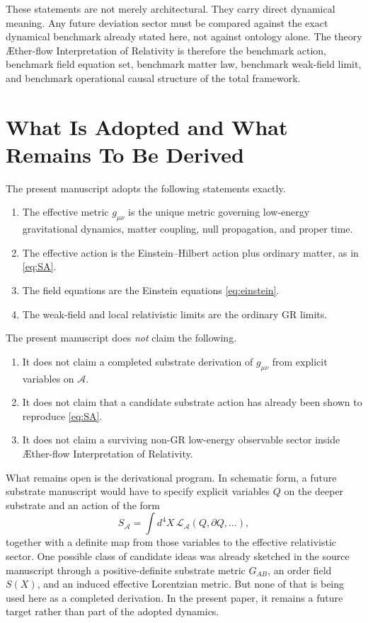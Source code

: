 \documentclass[11pt]{article}
\newcommand{\Aflow}{\AE{}ther-flow}
\newcommand{\TheoryName}{\Aflow{} Interpretation of Relativity}
\newcommand{\Sub}{\mathcal{A}}
\begin{document}
These statements are not merely architectural. They carry direct dynamical meaning. Any future deviation sector must be compared against the exact dynamical benchmark already stated here, not against ontology alone. The theory \TheoryName{} is therefore the benchmark action, benchmark field equation set, benchmark matter law, benchmark weak-field limit, and benchmark operational causal structure of the total framework.

\section{What Is Adopted and What Remains To Be Derived}

The present manuscript adopts the following statements exactly.
\begin{enumerate}
    \item The effective metric \(g_{\mu\nu}\) is the unique metric governing low-energy gravitational dynamics, matter coupling, null propagation, and proper time.
    \item The effective action is the Einstein--Hilbert action plus ordinary matter, as in \eqref{eq:SA}.
    \item The field equations are the Einstein equations \eqref{eq:einstein}.
    \item The weak-field and local relativistic limits are the ordinary GR limits.
\end{enumerate}

The present manuscript does \emph{not} claim the following.
\begin{enumerate}
    \item It does not claim a completed substrate derivation of \(g_{\mu\nu}\) from explicit variables on \(\Sub\).
    \item It does not claim that a candidate substrate action has already been shown to reproduce \eqref{eq:SA}.
    \item It does not claim a surviving non-GR low-energy observable sector inside \TheoryName{}.
\end{enumerate}

What remains open is the derivational program. In schematic form, a future substrate manuscript would have to specify explicit variables \(Q\) on the deeper substrate and an action of the form
\begin{equation}
S_{\Sub}
=
\int d^4X\,\mathcal{L}_{\Sub}(Q,\partial Q,\ldots),
\label{eq:substrateaction}
\end{equation}
together with a definite map from those variables to the effective relativistic sector. One possible class of candidate ideas was already sketched in the source manuscript through a positive-definite substrate metric \(G_{AB}\), an order field \(S(X)\), and an induced effective Lorentzian metric. But none of that is being used here as a completed derivation. In the present paper, it remains a future target rather than part of the adopted dynamics.
\end{document}
